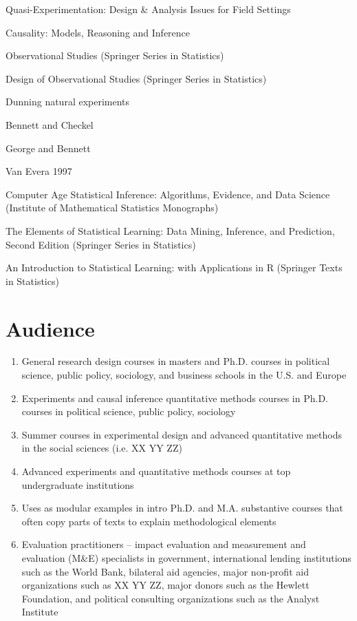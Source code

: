\documentclass[11pt]{article}
\begin{document}
Quasi-Experimentation: Design \& Analysis Issues for Field Settings

Causality: Models, Reasoning and Inference

Observational Studies (Springer Series in Statistics)

Design of Observational Studies (Springer Series in Statistics)

Dunning natural experiments


Bennett and Checkel

George and Bennett

Van Evera 1997


Computer Age Statistical Inference: Algorithms, Evidence, and Data Science (Institute of Mathematical Statistics Monographs)

The Elements of Statistical Learning: Data Mining, Inference, and Prediction, Second Edition (Springer Series in Statistics)

An Introduction to Statistical Learning: with Applications in R (Springer Texts in Statistics)

\section{Audience}

\begin{enumerate}
\item General research design courses in masters and Ph.D. courses in political science, public policy, sociology, and business schools in the U.S. and Europe

\item Experiments and causal inference quantitative methods courses in Ph.D. courses in political science, public policy, sociology

\item Summer courses in experimental design and advanced quantitative methods in the social sciences (i.e. XX YY ZZ)

\item Advanced experiments and quantitative methods courses at top undergraduate institutions

\item Uses as modular examples in intro Ph.D. and M.A. substantive courses that often copy parts of texts to explain methodological elements

\item Evaluation practitioners -- impact evaluation and measurement and evaluation (M\&E) specialists in government, international lending institutions such as the World Bank, bilateral aid agencies, major non-profit aid organizations such as XX YY ZZ, major donors such as the Hewlett Foundation, and political consulting organizations such as the Analyst Institute
\end{enumerate}
\end{document}
